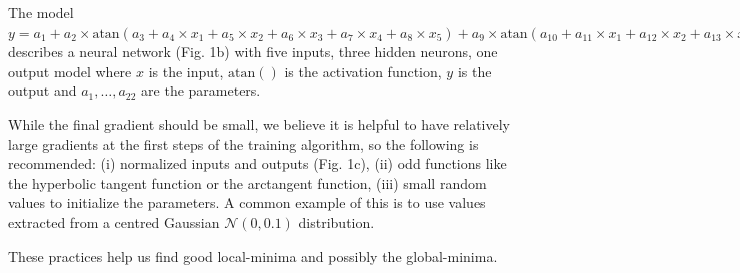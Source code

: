 The model
\(y = a_1 + a_2\times \text{atan}(a_3 + a_4\times x_1 + a_5\times x_2 + a_6\times x_3 + a_7\times x_4 + a_8\times x_5) + a_9\times \text{atan}(a_{10} + a_{11}\times x_1 + a_{12}\times x_2 + a_{13}\times x_3 + a_{14}\times x_4 + a_{15}\times x_5) + a_{16}\text{atan}(a_{17} + a_{18}\times x_1 + a_{19}\times x_2 + a_{20}\times x_3 + a_{21}\times x_4 + a_{22}\times x_5)\)
describes a neural network (Fig. 1b) with five inputs, three hidden
neurons, one output model where \(x\) is the input, \(\text{atan}()\) is
the activation function, \(y\) is the output and \(a_1,\dots,a_{22}\)
are the parameters.

While the final gradient should be small, we believe it is helpful to
have relatively large gradients at the first steps of the training
algorithm, so the following is recommended: (i) normalized inputs and
outputs (Fig. 1c), (ii) odd functions like the hyperbolic tangent
function or the arctangent function, (iii) small random values to
initialize the parameters. A common example of this is to use values
extracted from a centred Gaussian \(\mathcal N(0, 0.1)\) distribution.

These practices help us find good local-minima and possibly the
global-minima.

